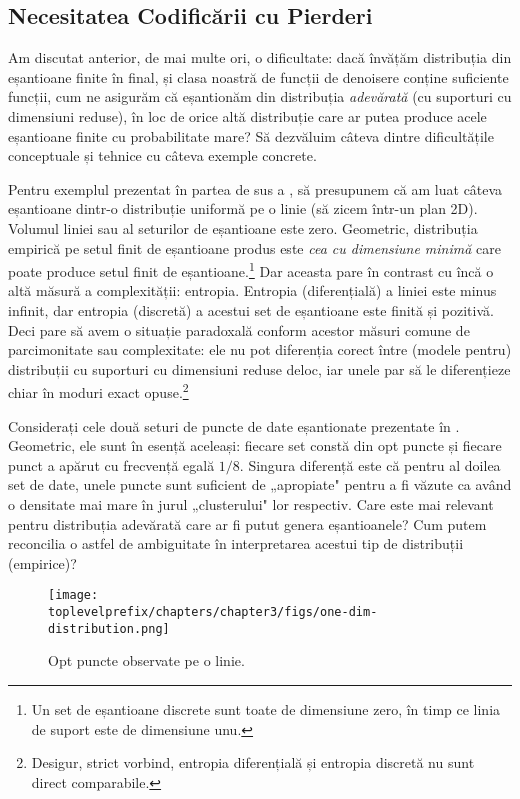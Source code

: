 \documentclass[../../book-main_ro.tex]{subfiles}
\begin{document}
\subsection{Necesitatea Codificării cu Pierderi}

Am discutat anterior, de mai multe ori, o dificultate: dacă învățăm distribuția din eșantioane finite în final, și clasa noastră de funcții de denoisere conține suficiente funcții, cum ne asigurăm că eșantionăm din distribuția \textit{adevărată} (cu suporturi cu dimensiuni reduse), în loc de orice altă distribuție care ar putea produce acele eșantioane finite cu probabilitate mare? Să dezvăluim câteva dintre dificultățile conceptuale și tehnice cu câteva exemple concrete.

\begin{example}\label{eg:measures-of-complexity}
Pentru exemplul prezentat în partea de sus a , să presupunem că am luat câteva eșantioane dintr-o distribuție uniformă pe o linie (să zicem într-un plan 2D). Volumul liniei sau al seturilor de eșantioane este zero.
Geometric, distribuția empirică pe setul finit de eșantioane produs este {\em cea cu dimensiune minimă} care poate produce setul finit de eșantioane.\footnote{Un set de eșantioane discrete sunt toate de dimensiune zero, în timp ce linia de suport este de dimensiune unu.} Dar aceasta pare în contrast cu încă o altă măsură a complexității: entropia. Entropia (diferențială) a liniei este minus infinit, dar entropia (discretă) a acestui set de eșantioane este finită și pozitivă. Deci pare să avem o situație paradoxală conform acestor măsuri comune de parcimonitate sau complexitate: ele nu pot diferenția corect între (modele pentru) distribuții cu suporturi cu dimensiuni reduse deloc, iar unele par să le diferențieze chiar în moduri exact opuse.\footnote{Desigur, strict vorbind, entropia diferențială și entropia discretă nu sunt direct comparabile.}
\end{example}

\begin{example}[Densitate]\label{eg:density} Considerați cele două seturi de puncte de date eșantionate prezentate în . Geometric, ele sunt în esență aceleași: fiecare set constă din opt puncte și fiecare punct a apărut cu frecvență egală $1/8$. Singura diferență este că pentru al doilea set de date, unele puncte sunt suficient de „apropiate" pentru a fi văzute ca având o densitate mai mare în jurul „clusterului" lor respectiv. Care este mai relevant pentru distribuția adevărată care ar fi putut genera eșantioanele? Cum putem reconcilia o astfel de ambiguitate în interpretarea acestui tip de distribuții (empirice)?
\begin{figure}[t]
	\centering
	\texttt{[image: \\toplevelprefix/chapters/chapter3/figs/one-dim-distribution.png]}
	\caption{Opt puncte observate pe o linie.}
	\label{fig:1d-line}
\end{figure}
\end{example}
\end{document}
